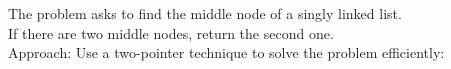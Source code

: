 \documentclass[preview]{standalone}
\begin{document}
The problem asks to find the middle node of a singly linked list.\\If there are two middle nodes, return the second one.\\Approach: Use a two-pointer technique to solve the problem efficiently:\\
\end{document}
